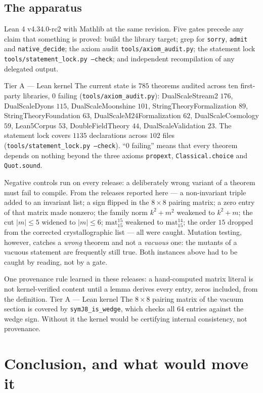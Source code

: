 \documentclass[11pt,a4paper]{article}
\theoremstyle{remark}
\newcommand{\tierA}{\colorbox{green!15}{\textsf{\scriptsize Tier A --- Lean kernel}}}
\newcommand{\lean}[1]{\texttt{#1}}
\begin{document}
\subsection*{The apparatus}

Lean 4 v4.34.0-rc2 with Mathlib at the same revision. Five gates precede any claim
that something is proved: build the library target; grep for \texttt{sorry},
\texttt{admit} and \texttt{native\_decide}; the axiom audit
\lean{tools/axiom\_audit.py}; the statement lock \lean{tools/statement\_lock.py --check};
and independent recompilation of any delegated output.

\tierA{} The current state is $785$ theorems audited across ten first-party
libraries, $0$ failing (\lean{tools/axiom\_audit.py}): DualScaleStream2 $176$,
DualScaleDyons $115$, DualScaleMoonshine $101$, StringTheoryFormalization $89$,
StringTheoryFoundation $63$, DualScaleM24Formalization $62$, DualScaleCosmology $59$,
Lean5Corpus $53$, DoubleFieldTheory $44$, DualScaleValidation $23$. The statement
lock covers $1135$ declarations across $102$ files
(\lean{tools/statement\_lock.py --check}). ``$0$ failing'' means that every theorem
depends on nothing beyond the three axioms \texttt{propext},
\texttt{Classical.choice} and \texttt{Quot.sound}.

Negative controls run on every release: a deliberately wrong variant of a theorem
must fail to compile. From the releases reported here --- a non-invariant triple
added to an invariant list; a sign flipped in the $8 \times 8$ pairing matrix; a zero
entry of that matrix made nonzero; the family norm $k^2 + m^2$ weakened to
$k^2 + m$; the cut $|m| \le 5$ widened to $|m| \le 6$; $\mathrm{mat}_{15}^{15}$
weakened to $\mathrm{mat}_{15}^{14}$; the order $15$ dropped from the corrected
crystallographic list --- all were caught. Mutation testing, however, catches a
\emph{wrong} theorem and not a \emph{vacuous} one: the mutants of a vacuous statement
are frequently still true. Both instances above had to be caught by reading, not by
a gate.

One provenance rule learned in these releases: a hand-computed matrix literal is not
kernel-verified content until a lemma derives every entry, zeros included, from the
definition. \tierA{} The $8 \times 8$ pairing matrix of the vacuum section is covered
by \lean{symJ8\_is\_wedge}, which checks all $64$ entries against the wedge sign.
Without it the kernel would be certifying internal consistency, not provenance.

\section{Conclusion, and what would move it}
\label{sec:concl}
\end{document}

